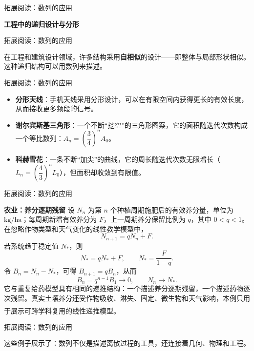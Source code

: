\documentclass[aspectratio=169,10pt,fontset=fandol]{ctexbeamer}
\newcommand{\upcite}[1]{\textsuperscript{\textsuperscript{\cite{#1}}}}
\begin{document}
\begin{frame}[t,fragile]{拓展阅读：数列的应用}
\footnotesize
{\footnotesize

\textbf{工程中的递归设计与分形}


}
\end{frame}
\begin{frame}[t,fragile]{拓展阅读：数列的应用}
\footnotesize
{\footnotesize
在工程和建筑设计领域，许多结构采用\textbf{自相似}的设计——即整体与局部形状相似。这种递归结构可以用数列来描述。


}
\end{frame}
\begin{frame}[t,fragile]{拓展阅读：数列的应用}
\footnotesize
{\footnotesize
\begin{itemize}
\item \textbf{分形天线}：手机天线采用分形设计，可以在有限空间内获得更长的有效长度，从而接收更多频段的信号。
\item \textbf{谢尔宾斯基三角形}：一个不断“挖空”的三角形图案，它的面积随迭代次数构成一个等比数列：\(A_n = \left(\dfrac{3}{4}\right)^n A_0\)。
\item \textbf{科赫雪花}：一条不断“加尖”的曲线，它的周长随迭代次数无限增长（\(L_n = \left(\dfrac{4}{3}\right)^n L_0\)），但面积却收敛到有限值。
\end{itemize}
}
\end{frame}
\begin{frame}[t,fragile]{拓展阅读：数列的应用}
\footnotesize
{\footnotesize

\textbf{农业：养分逐期残留}
设 $N_n$ 为第 $n$ 个种植周期施肥后的有效养分量，单位为 $\mathrm{kg/ha}$；每周期新增有效养分为 $F$，上一周期养分保留比例为 $q$，其中 $0<q<1$。在忽略作物类型和天气变化的线性教学模型中，
\[
N_{n+1}=qN_n+F.
\]
若系统趋于稳定值 $N_*$，则
\[
N_*=qN_*+F,\qquad N_*=\frac{F}{1-q}.
\]
令 $B_n=N_n-N_*$，可得 $B_{n+1}=qB_n$，从而
\[
B_n=q^{n-1}B_1\to0,\qquad N_n\to N_*.
\]
它与重复给药模型具有相同的递推结构：一个描述养分逐期残留，一个描述药物逐次残留。真实土壤养分还受作物吸收、淋失、固定、微生物和天气影响，本例只用于展示可跨学科复用的线性递推模型。\upcite{BradyWeil}


}
\end{frame}
\begin{frame}[t,fragile]{拓展阅读：数列的应用}
\footnotesize
{\footnotesize
这些例子展示了：数列不仅是描述离散过程的工具，还连接着几何、物理和工程。

}
\end{frame}
\end{document}
